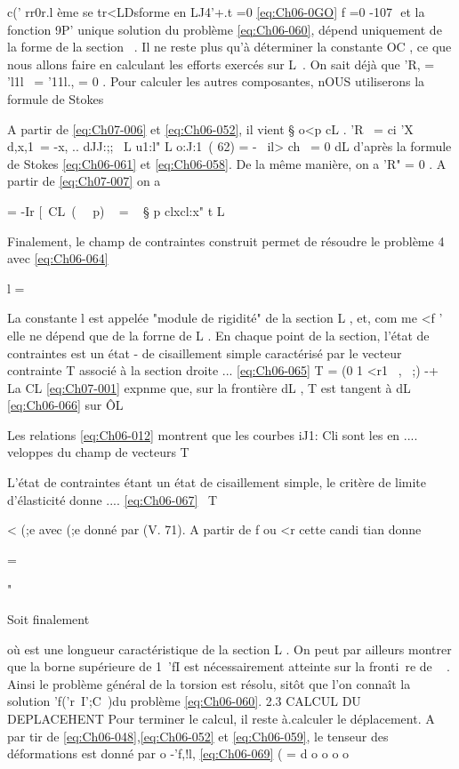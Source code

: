 c(' rr0r.l ème se tr<LDsforme en 
LJ4'+.t =0 
\eqref{eq:Ch06-0GO} f 
=0 
-107 ­
et la fonction 9P' unique solution du problème \eqref{eq:Ch06-060}, dépend uniquement de la forme de la section ~. 
Il ne reste plus qu'à déterminer la constante OC , ce que nous al­lons faire en calculant les efforts exercés sur L~. On sait déjà que 'R, = 'l1l~ = '11l., = 0 . Pour calculer les autres composantes, nOUS utiliserons la formule de Stokes 

A partir de \eqref{eq:Ch07-006} et \eqref{eq:Ch06-052}, il vient 
§ o<p cL .
'R~ = ci 'X~ d,x,1\ = -x, .. dJJ:;;
~L u1:l" 
L o:J:1\
( 62) = -~ il> ch~ = 0 
dL 
d'après la formule de Stokes \eqref{eq:Ch06-061} et \eqref{eq:Ch06-058}. De la même manière, on a 'R" = 0 . A partir de \eqref{eq:Ch07-007} on a 

= -Ir [~CL~(~~ p) ~ 
= ~ § p clxcl:x"
t
L 


Finalement, le champ de contraintes construit permet de résoudre le problème 4 avec 
\eqref{eq:Ch06-064} 

l = 

La constante l est appelée "module de rigidité" de la section L , et, com­
me <f ' elle ne dépend que de la forrne de L . 
En chaque point de la section, l'état de contraintes est un état
-
de cisaillement simple caractérisé par le vecteur contrainte T associé à la section droite 
... 
\eqref{eq:Ch06-065} 
T = (0 1 <r1~ , ~;) 
-+ 
La CL \eqref{eq:Ch07-001} expnme que, sur la frontière dL , T est tangent à dL 
\eqref{eq:Ch06-066} sur ÔL 

Les relations \eqref{eq:Ch06-012} montrent que les courbes iJ1: Cli sont les en­
.... 
veloppes du champ de vecteurs T 

L'état de contraintes étant un état de cisaillement simple, le critère de limite d'élasticité donne 
.... 
\eqref{eq:Ch06-067} \ T \ ~ 

< (;e 
avec (;e donné par (V. 71). A partir de f ou <r cette candi tian donne 

= 

" 

Soit finalement 

où est une longueur caractéristique de la section L . On peut par ail­leurs montrer que la borne supérieure de 1~'fI est nécessairement atteinte sur la fronti~re de ~ . Ainsi le problème général de la torsion est résolu, sitôt que l'on connaît la solution 'f('r~I';C~)du problème \eqref{eq:Ch06-060}. 
2.3 CALCUL DU DEPLACEHENT 
Pour terminer le calcul, il reste à.calculer le déplacement. A par­
tir de \eqref{eq:Ch06-048},\eqref{eq:Ch06-052} et \eqref{eq:Ch06-059}, le tenseur des déformations est donné par 
o 
-'f,!l, 
\eqref{eq:Ch06-069} ( = d o o o o 

